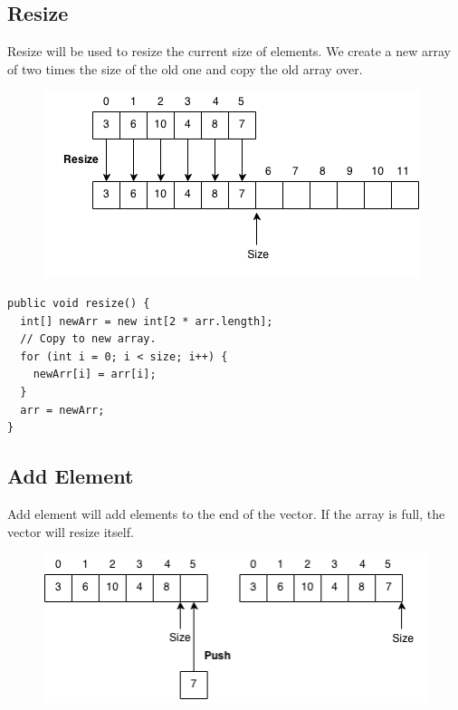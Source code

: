 \documentclass[11pt,oneside]{book}
\makeatletter
\def\maxwidth#1{\ifdim\Gin@nat@width>#1 #1\else\Gin@nat@width\fi}
\makeatother
\begin{document}
\subsection{Resize}

Resize will be used to resize the current size of elements. We create a new array of two times the size of the old one and copy the old array over.

\vspace{5px}\begin{figure}[H]\centering
        \includegraphics[width=0.66\maxwidth{\textwidth}]{vector3.png}
        \end{figure}

\begin{lstlisting}
public void resize() {
  int[] newArr = new int[2 * arr.length];
  // Copy to new array.
  for (int i = 0; i < size; i++) {
    newArr[i] = arr[i];
  }
  arr = newArr;
}
\end{lstlisting}

\subsection{Add Element}

Add element will add elements to the end of the vector. If the array is full, the vector will resize itself.

\vspace{5px}\begin{figure}[H]\centering
        \includegraphics[width=0.66\maxwidth{\textwidth}]{vector2.png}
        \end{figure}
\end{document}
